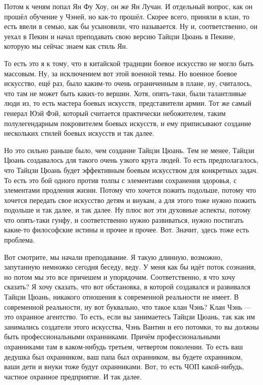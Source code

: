 Потом к ченям попал Ян Фу Хоу,  
он же Ян Лучан.  И отдельный вопрос, как он прошёл 
обучение у Чэней, но как-то прошёл. Скорее всего, 
приняли в клан, то есть ввели в семью, как бы усыновили, 
что называется.  Ну и, соответственно, он уехал в Пекин 
и начал преподавать свою версию Тайцзи Цюань в 
Пекине,  которую мы сейчас знаем как стиль Ян.

То есть 
это я к тому,  что в китайской традиции боевое 
искусство не могло быть массовым. Ну, за исключением 
вот этой военной темы. Но военное боевое искусство, ещё
раз, было каким-то очень ограниченным в плане, ну,  
считалось, что там не может быть каких-то вершин.  Хотя, 
опять-таки,  были талантливые люди из, то есть мастера 
боевых искусств, представители армии. Тот же самый 
генерал Юэй Фэй, который считается практически 
небожителем,  таким полулегендарным покровителем 
боевых искусств,  и ему приписывают создание 
нескольких стилей боевых искусств и так далее.

Но это 
сильно раньше было,  чем создание Тайцзи Цюань. Тем не 
менее,  Тайцзи Цюань создавалось для такого очень 
узкого круга людей.  То есть предполагалось, что Тайцзи 
Цюань будет эффективным боевым искусством для 
конкретных задач. То есть это бой одного против толпы 
с элементами сохранения здоровья, с элементами 
продления жизни. Потому что хочется пожить подольше,  
потому что хочется передать свое искусство детям и 
внукам, а для этого тоже нужно пожить подольше и так 
далее, и так далее. Ну плюс вот эти духовные аспекты, 
потому что опять-таки гунфу, и соответственно нужно 
развиваться, нужно постигать какие-то философские 
истины и прочее и прочее. Вот. Значит,  здесь тоже есть 
проблема.

Вот смотрите, мы начали преподавание.  Я 
такую длинную, возможно, запутанную немножко сегодня 
беседу, веду.  У меня как бы идёт поток 
сознания,  но потом мы это все причешем и упорядочим. 
Соответственно, я что хочу сказать? Я хочу сказать,  
что вот обстановка, в которой создавался и развивался 
Тайцзи Цюань,  никакого отношения к современной 
реальности не имеет. В современной реальности, ну вот 
буквально, что такое клан Чэнь?  Клан Чэнь --- это 
охранное агентство. То есть, если вы занимаетесь 
Тайцзи Цюань, так как им занимались создатели этого 
искусства, Чэнь Вантин и его потомки, то вы должны быть 
профессиональными охранниками. Причём 
профессиональными охранниками там в каком-нибудь 
третьем, четвертом поколении. То есть ваш дедушка был 
охранником,  ваш папа был охранником, вы будете 
охранником, ваши дети и внуки тоже будут охранниками.  
Вот, то есть ЧОП какой-нибудь,  частное 
охранное предприятие. И так далее.

